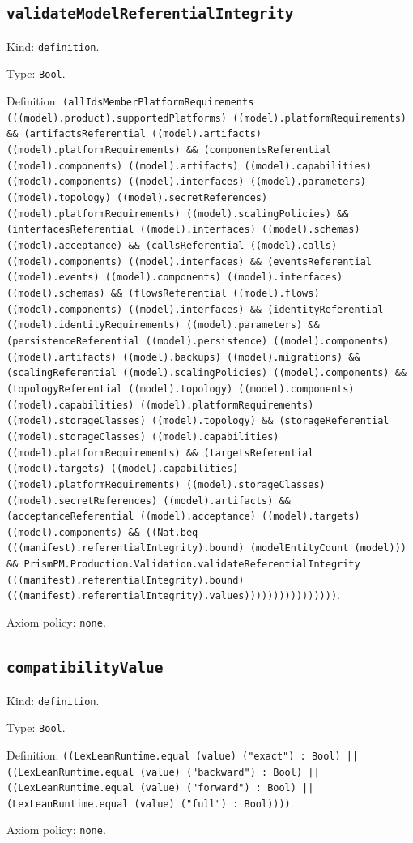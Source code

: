 \documentclass[11pt]{article}
\begin{document}
\subsection*{\texttt{validateModelReferentialIntegrity}}
\noindent Kind: \texttt{definition}.\par
\noindent Type: \texttt{Bool}.\par
\noindent Definition: \texttt{(allIdsMemberPlatformRequirements (((model).product).supportedPlatforms) ((model).platformRequirements) \&\& (artifactsReferential ((model).artifacts) ((model).platformRequirements) \&\& (componentsReferential ((model).components) ((model).artifacts) ((model).capabilities) ((model).components) ((model).interfaces) ((model).parameters) ((model).topology) ((model).secretReferences) ((model).platformRequirements) ((model).scalingPolicies) \&\& (interfacesReferential ((model).interfaces) ((model).schemas) ((model).acceptance) \&\& (callsReferential ((model).calls) ((model).components) ((model).interfaces) \&\& (eventsReferential ((model).events) ((model).components) ((model).interfaces) ((model).schemas) \&\& (flowsReferential ((model).flows) ((model).components) ((model).interfaces) \&\& (identityReferential ((model).identityRequirements) ((model).parameters) \&\& (persistenceReferential ((model).persistence) ((model).components) ((model).artifacts) ((model).backups) ((model).migrations) \&\& (scalingReferential ((model).scalingPolicies) ((model).components) \&\& (topologyReferential ((model).topology) ((model).components) ((model).capabilities) ((model).platformRequirements) ((model).storageClasses) ((model).topology) \&\& (storageReferential ((model).storageClasses) ((model).capabilities) ((model).platformRequirements) \&\& (targetsReferential ((model).targets) ((model).capabilities) ((model).platformRequirements) ((model).storageClasses) ((model).secretReferences) ((model).artifacts) \&\& (acceptanceReferential ((model).acceptance) ((model).targets) ((model).components) \&\& ((Nat.beq (((manifest).referentialIntegrity).bound) (modelEntityCount (model))) \&\& PrismPM.Production.Validation.validateReferentialIntegrity (((manifest).referentialIntegrity).bound) (((manifest).referentialIntegrity).values))))))))))))))))}.\par
\noindent Axiom policy: \texttt{none}.\par
\subsection*{\texttt{compatibilityValue}}
\noindent Kind: \texttt{definition}.\par
\noindent Type: \texttt{Bool}.\par
\noindent Definition: \texttt{((LexLeanRuntime.equal (value) ("exact") : Bool) || ((LexLeanRuntime.equal (value) ("backward") : Bool) || ((LexLeanRuntime.equal (value) ("forward") : Bool) || (LexLeanRuntime.equal (value) ("full") : Bool))))}.\par
\noindent Axiom policy: \texttt{none}.\par
\end{document}
